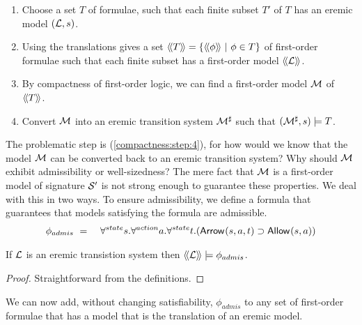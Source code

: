\begin{enumerate}

\item Choose a set $T$ of \ELABR{} formulae, such that each finite
  subset $T'$ of $T$ has an eremic model $(\mathcal{L}, s)$.

\item Using the translations gives a set $\langle\!\langle T \rangle\!\rangle =
  \{\langle\!\langle \phi \rangle\!\rangle\ |\ \phi \in T\}$ of first-order formulae such that
  each finite subset has a first-order model $\langle\!\langle \mathcal{L} \rangle\!\rangle$.

\item By compactness of first-order logic, we can find a first-order
  model $\mathcal{M}$ of $\langle\!\langle T \rangle\!\rangle$.

\item\label{compactness:step:4} Convert $\mathcal{M}$ into an eremic transition system
  $\mathcal{M}^{\sharp}$ such that $(\mathcal{M}^{\sharp}, s) \models T$.

\end{enumerate}

\NI The problematic step is (\ref{compactness:step:4}), for how would
we know that the model $\mathcal{M}$ can be converted back to an eremic
transition system? Why should $\mathcal{M}$ exhibit admissibility or
well-sizedness?  The mere fact that $\mathcal{M}$ is a first-order model
of signature $\mathcal{S}'$ is not strong enough to guarantee these
properties.  We deal with this in two ways. To ensure admissibility,
we define a formula that guarantees that models satisfying the formula
are admissible.
\begin{eqnarray*}
   \phi_{admis} 
      & \ =\ &
   \forall^{state} s.\forall^{action} a.\forall^{state} t.( \mathsf{Arrow}^{}(s, a, t) \supset \mathsf{Allow}^{}(s, a))
\end{eqnarray*}

\begin{lemma}\label{compactness:lemma:23399}
If $\mathcal{L}$ is an eremic transistion system then $\langle\!\langle \mathcal{L} \rangle\!\rangle \models
\phi_{admis}$.
\end{lemma}

\begin{proof}
Straightforward from the definitions.

\end{proof}

\NI We can now add, without changing satisfiability, $\phi_{admis}$ to
any set of first-order formulae that has a model that is the
translation of an eremic model.


